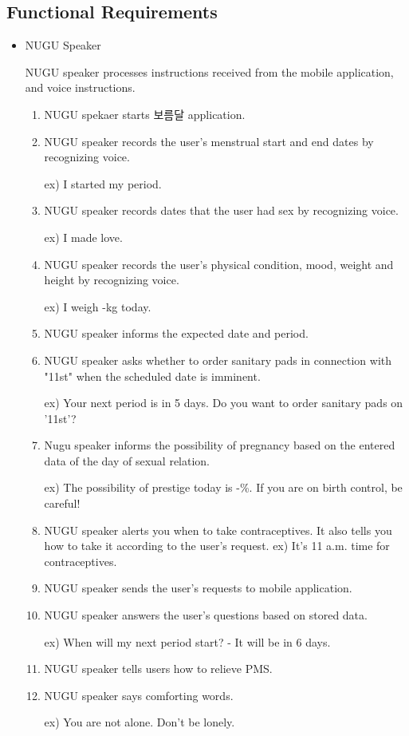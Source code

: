 \documentclass[conference]{IEEEtran}
\begin{document}
\subsection{Functional Requirements}
\begin{itemize}
\setlength{\parindent}{2ex}
\item NUGU Speaker

NUGU speaker processes instructions received from the mobile application, and voice instructions.
\begin{enumerate}
\item NUGU spekaer starts 보름달 application.
\item NUGU speaker records the user’s menstrual start and end dates by recognizing voice.

ex) I started my period.
\item NUGU speaker records dates that the user had sex by recognizing voice.

ex) I made love. 
\item NUGU speaker records the user's physical condition, mood, weight and height by recognizing voice.

ex) I weigh -kg today.
\item NUGU speaker informs the expected date and period. 
\item NUGU speaker asks whether to order sanitary pads in connection with  "11st" when the scheduled date is imminent.

ex) Your next period is in 5 days. Do you want to order sanitary pads on '11st'?
\item Nugu speaker informs the possibility of pregnancy based on the entered data of the day of sexual relation.

ex) The possibility of prestige today is -\%. If you are on birth control, be careful!
\item NUGU speaker alerts you when to take contraceptives. It also tells you how to take it according to the user's request.
ex) It's 11 a.m. time for contraceptives.

\item NUGU speaker sends the user's requests to mobile application.
\item NUGU speaker answers the user’s questions based on stored data.

ex) When will my next period start? - It will be in 6 days.
\item NUGU speaker tells users how to relieve PMS.
\item NUGU speaker says comforting words.

ex) You are not alone. Don’t be lonely.
\end{enumerate}
\end{itemize}
\end{document}
